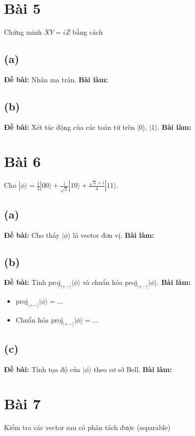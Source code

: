 \section{Bài 5}
Chứng minh $XY=iZ$ bằng cách

\subsection{(a)}
\textbf{Đề bài:} Nhân ma trận.
\textbf{Bài làm:}

\subsection{(b)}
\textbf{Đề bài:} Xét tác động của các toán tử trên $|0\rangle$, $|1\rangle$.
\textbf{Bài làm:}

\section{Bài 6}
Cho $|\phi\rangle=\frac{1}{2}|00\rangle+\frac{i}{\sqrt{2}}|10\rangle+\frac{\sqrt{3}+i}{4}|11\rangle$.

\subsection{(a)}
\textbf{Đề bài:} Cho thấy $|\phi\rangle$ là vector đơn vị.
\textbf{Bài làm:}

\subsection{(b)}
\textbf{Đề bài:} Tính $\mathrm{proj}_{|+-\rangle}|\phi\rangle$ và chuẩn hóa $\mathrm{proj}_{|+-\rangle}|\phi\rangle$.
\textbf{Bài làm:}
\begin{itemize}
    \item $\mathrm{proj}_{|+-\rangle}|\phi\rangle = \dots$
    \item Chuẩn hóa $\mathrm{proj}_{|+-\rangle}|\phi\rangle = \dots$
\end{itemize}

\subsection{(c)}
\textbf{Đề bài:} Tính tọa độ của $|\phi\rangle$ theo cơ sở Bell.
\textbf{Bài làm:}

\section{Bài 7}
Kiểm tra các vector sau có phân tách được (separable)

